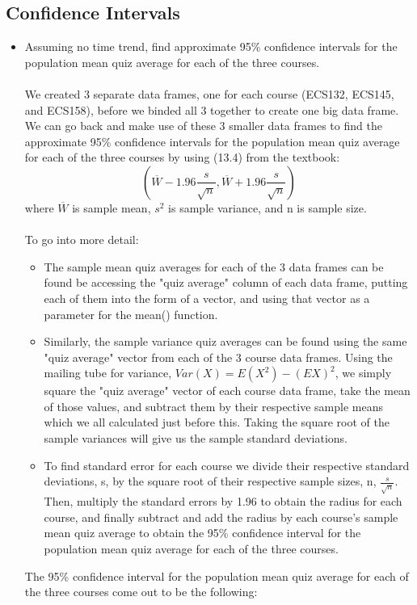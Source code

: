 \documentclass{article}
\begin{document}
        \subsection{Confidence Intervals}
        \begin{itemize}
        
        \item Assuming no time trend, find approximate 95\% confidence intervals for the population mean quiz average for each of the three courses.
        \\ \\We created 3 separate data frames, one for each course (ECS132, ECS145, and ECS158), before we binded all 3 together to create one big data frame. We can go back and make use of these 3 smaller data frames to find the approximate 95\% confidence intervals for the population mean quiz average for each of the three courses by using (13.4) from the textbook:
       $$(\overline{W} - 1.96 \frac{s}{\sqrt{n}} , \overline{W} + 1.96 \frac{s}{\sqrt{n}})
       $$
       where $\overline{W}$ is sample mean, $s^2$ is sample variance, and n is sample size.
        \\\\To go into more detail:
            \begin{itemize}
                \item The sample mean quiz averages for each of the 3 data frames can be found be accessing the "quiz average" column of each data frame, putting each of them into the form of a vector, and using that vector as a parameter for the mean() function.
                
                \item Similarly, the sample variance quiz averages can be found using the same "quiz average" vector from each of the 3 course data frames. Using the mailing tube for variance, $Var(X) = E(X^2) - (EX)^2$, we simply square the "quiz average" vector of each course data frame, take the mean of those values, and subtract them by their respective sample means which we all calculated just before this. Taking the square root of the sample variances will give us the sample standard deviations. 
                
                \item To find standard error for each course we divide their respective standard deviations, s, by the square root of their respective sample sizes, n, $\frac{s}{\sqrt{n}}$. Then, multiply the standard errors by 1.96 to obtain the radius for each course, and finally subtract and add the radius by each course's sample mean quiz average to obtain the 95\% confidence interval for the population mean quiz average for each of the three courses. 
           \end{itemize}
           The 95\% confidence interval for the population mean quiz average for each of the three courses come out to be the following:\\
            

\end{itemize}
\end{document}

